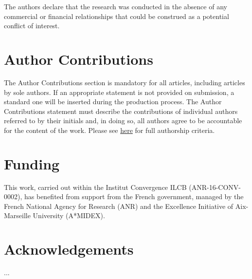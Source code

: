 \documentclass[utf8]{template/frontiersSCNS} %
\begin{document}
The authors declare that the research was conducted in the absence of any commercial or financial relationships that could be construed as a potential conflict of interest.

\section*{Author Contributions}

The Author Contributions section is mandatory for all articles, including articles by sole authors. If an appropriate statement is not provided on submission, a standard one will be inserted during the production process. The Author Contributions statement must describe the contributions of individual authors referred to by their initials and, in doing so, all authors agree to be accountable for the content of the work. Please see  \href{http://home.frontiersin.org/about/author-guidelines#AuthorandContributors}{here} for full authorship criteria.

\section*{Funding}


This work, carried out within the Institut Convergence ILCB (ANR-16-CONV-0002), has benefited from support from the French government, managed by the French National Agency for Research (ANR) and the Excellence Initiative of Aix-Marseille University (A*MIDEX).

\section*{Acknowledgements}

...


\end{document}
